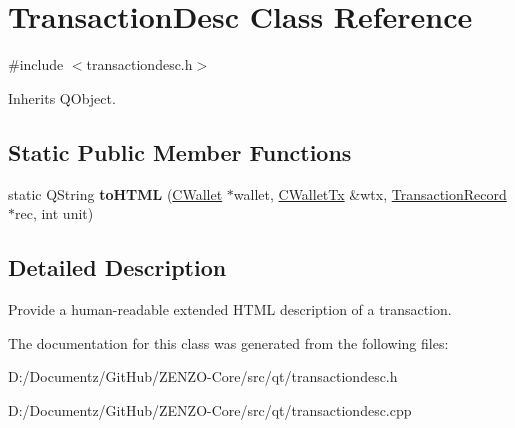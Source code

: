 \hypertarget{class_transaction_desc}{}\section{Transaction\+Desc Class Reference}
\label{class_transaction_desc}


{\ttfamily \#include $<$transactiondesc.\+h$>$}



Inherits Q\+Object.

\subsection*{Static Public Member Functions}
\begin{DoxyCompactItemize}
\item 
\mbox{\label{class_transaction_desc_ab7c9dbb2048aae121dd9d75df86e64f4}} 
static Q\+String {\bfseries to\+H\+T\+ML} (\mbox{\hyperlink{class_c_wallet}{C\+Wallet}} $\ast$wallet, \mbox{\hyperlink{class_c_wallet_tx}{C\+Wallet\+Tx}} \&wtx, \mbox{\hyperlink{class_transaction_record}{Transaction\+Record}} $\ast$rec, int unit)
\end{DoxyCompactItemize}


\subsection{Detailed Description}
Provide a human-\/readable extended H\+T\+ML description of a transaction. 

The documentation for this class was generated from the following files\+:\begin{DoxyCompactItemize}
\item 
D\+:/\+Documentz/\+Git\+Hub/\+Z\+E\+N\+Z\+O-\/\+Core/src/qt/transactiondesc.\+h\item 
D\+:/\+Documentz/\+Git\+Hub/\+Z\+E\+N\+Z\+O-\/\+Core/src/qt/transactiondesc.\+cpp\end{DoxyCompactItemize}
